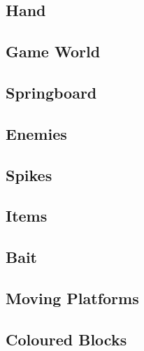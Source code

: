 \subsection{Hand}
\subsection{Game World}
\subsection{Springboard}
\subsection{Enemies}
\subsection{Spikes}
\subsection{Items}
\subsection{Bait}
\subsection{Moving Platforms}
\subsection{Coloured Blocks}




